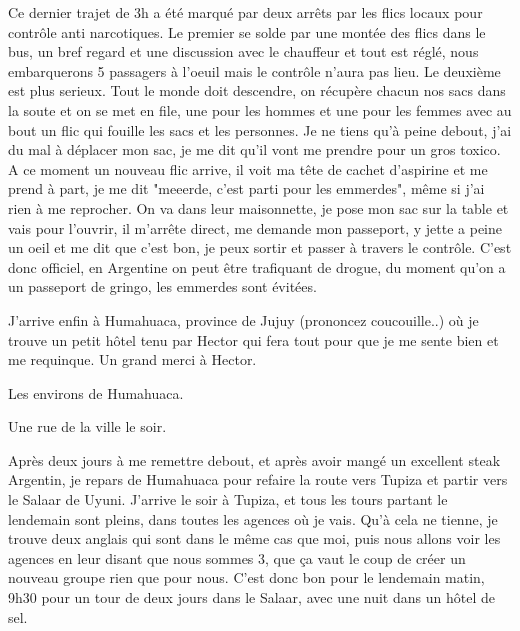 \begin{multicols}{2}
Ce dernier trajet de 3h a été marqué par deux arrêts par les flics locaux pour contrôle anti narcotiques. Le premier se solde par une montée des flics dans le bus, un bref regard et une discussion avec le chauffeur et tout est réglé, nous embarquerons 5 passagers à l'oeuil mais le contrôle n'aura pas lieu. Le deuxième est plus serieux. Tout le monde doit descendre, on récupère chacun nos sacs dans la soute et on se met en file, une pour les hommes et une pour les femmes avec au bout un flic qui fouille les sacs et les personnes. Je ne tiens qu'à peine debout, j'ai du mal à déplacer mon sac, je me dit qu'il vont me prendre pour un gros toxico. A ce moment un nouveau flic arrive, il voit ma tête de cachet d'aspirine et me prend à part, je me dit "meeerde, c'est parti pour les emmerdes", même si j'ai rien à me reprocher. On va dans leur maisonnette, je pose mon sac sur la table et vais pour l'ouvrir, il m'arrête direct, me demande mon passeport, y jette a peine un oeil et me dit que c'est bon, je peux sortir et passer à travers le contrôle. C'est donc officiel, en Argentine on peut être trafiquant de drogue, du moment qu'on a un passeport de gringo, les emmerdes sont évitées.

J'arrive enfin à Humahuaca, province de Jujuy (prononcez coucouille..) où je trouve un petit hôtel tenu par Hector qui fera tout pour que je me sente bien et me requinque. Un grand merci à Hector.


Les environs de Humahuaca.


Une rue de la ville le soir.


Après deux jours à me remettre debout, et après avoir mangé un excellent steak Argentin, je repars de Humahuaca pour refaire la route vers Tupiza et partir vers le Salaar de Uyuni. J'arrive le soir à Tupiza, et tous les tours partant le lendemain sont pleins, dans toutes les agences où je vais. Qu'à cela ne tienne, je trouve deux anglais qui sont dans le même cas que moi, puis nous allons voir les agences en leur disant que nous sommes 3, que ça vaut le coup de créer un nouveau groupe rien que pour nous. C'est donc bon pour le lendemain matin, 9h30 pour un tour de deux jours dans le Salaar, avec une nuit dans un hôtel de sel.


\end{multicols}
